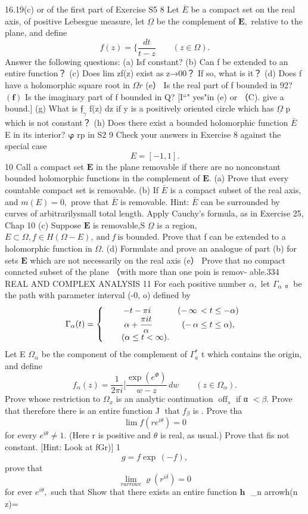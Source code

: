 16.19(c) or of the first part of Exercise S5 8 Let $\bar{E}$ be a compact set on the real axis, of positive Lebesgue measure, let $\underline{{\Omega}}$ be the complement of ${\boldsymbol{E}},$ relative to the plane, and define $$ f(z)= \{\frac{d t}{t-z}\quad\quad(z\in\Omega). $$ Answer the following questions: (a) Isf constant? (b) Can f be extended to an entire function？ (c) Does lim zf(z) exist as z→00？ If so, what is it？ (d) Does f have a holomorphic square root in $\Omega{\dot{r}}$ (e） Is the real part of f bounded in 92? $\mathbf{(f)}$ Is the imaginary part of f bounded in Q? [I“" yes"in (e) or （C). give a bound.] (g) What is ${\mathfrak{f}}_{\gamma}$ f(z) dz if y is a positively oriented circle which has $\underline{{\Omega}}$ p which is not constant？ (h) Does there exist a bounded holomorphic function $\bar{E}$ E in its interior? $\mathcal{\boldsymbol{\varphi}}$ rp in S2 9 Check your answers in Exercise 8 against the special case $$ E=[-1,1]. $$ 10 Call a compact set $\boldsymbol{E}$ in the plane removable if there are no nonconstant bounded holomorphic functions in the complement of ${\boldsymbol{E}}.$ (a) Prove that every countable compact set is removable. (b) If $\bar{E}$ is a compact subset of the real axis, and $m(E)=0,$ prove that $\bar{E}$ is removable. Hint: $\bar{E}$ can be surrounded by curves of arbitrarilysmall total length. Apply Cauchy's formula, as in Exercise 25, Chap 10 (c) Suppose $\boldsymbol{E}$ is removable,S $\underline{{\Omega}}$ is a region, $E\subset\Omega,f\in H(\Omega-E),{\mathrm{~and~}}f{\mathrm{~is}}$ bounded. Prove that f can be extended to a holomorphic function in $\Omega.$ (d) Formulate and prove an analogue of part (b) for sets $\boldsymbol{E}$ which are not necessarily on the real axis (e） Prove that no compact conncted subset of the plane （with more than one poin is remov- able.334 REAL AND COMPLEX ANALYSIS 11 For each positive number $\alpha,$ let $\Gamma_{\alpha}$ 。be the path with parameter interval (-0, o) defined by $$ \Gamma_{\alpha}(t)=\left\{\begin{array}{c c}{{-t-\pi i\ }}&{{(-\,\infty\,<t\leq-\alpha)}}\\ {{\alpha+\displaystyle\frac{\pi i t}{\alpha}}}&{{(-\,\alpha\leq t\leq\alpha),}}\\ {{\ \ \ \ \ (\alpha\leq t<\infty).}}\end{array}\right. $$ Let E $\Omega_{\alpha}$ be the component of the complement of $\textstyle\Gamma_{a}^{*}$ t which contains the origin, and define $$ f_{\alpha}(z)={\frac{1}{2\pi i}} [\frac{\exp{(e^{\Phi})}}{{w}-z}\,d{w}\qquad(z\in\Omega_{\alpha}). $$ Prove whose restriction to $\Omega_{x}$ is an analytic continuation $\operatorname{off}_{s}$ if α $<\beta.$ Prove that therefore there is an entire function J $\operatorname{that}f_{\beta}$ is . Prove tha $$ \operatorname*{lim}f(r e^{i\theta})=0 $$ for every $e^{i\theta}\neq1.$ (Here r is positive and $\theta\nonumber$ is real, as usual.) Prove that fis not constant. [Hint: Look at fGr)] 1 $$ g=f\exp\,(-f), $$ prove that $$ \operatorname*{lim}_{r arrow c}\varrho(r^{i\delta})=0 $$ for ever $e^{i\theta},$ such that Show that there exists an entire function ${\boldsymbol{h}}$ $$ _{n arrow\infty}h(n z)= 